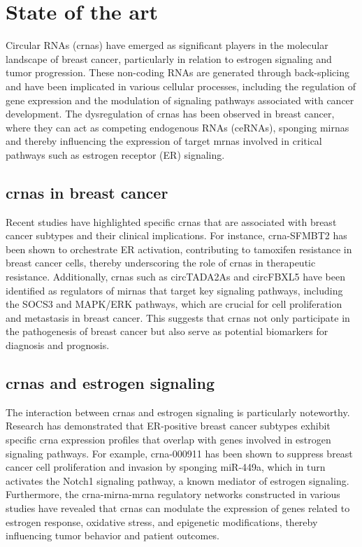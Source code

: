 \section{State of the art}
Circular RNAs (\gls{crna}s) have emerged as significant players in the
molecular landscape of breast cancer, particularly in relation to estrogen
signaling and tumor progression.
These non-coding RNAs are generated through back-splicing and have been
implicated in various cellular processes, including the regulation of gene
expression and the modulation of signaling pathways associated with cancer
development\supercite{li_circrna-sfmbt2_2023,tran_new_2020}.
The dysregulation of \gls{crna}s has been observed in breast cancer, where they
can act as competing endogenous RNAs (ceRNAs), sponging \gls{mirna}s and
thereby influencing the expression of target \gls{mrna}s involved in critical
pathways such as estrogen receptor (ER)
signaling\supercite{nair_circular_2016,xu_circrna_2022}.

\subsection{\Gls{crna}s in breast cancer}
Recent studies have highlighted specific \gls{crna}s that are associated with
breast cancer subtypes and their clinical implications.
For instance, \gls{crna}-SFMBT2 has been shown to orchestrate ER\textalpha{}
activation, contributing to tamoxifen resistance in breast cancer cells,
thereby underscoring the role of \gls{crna}s in therapeutic
resistance\supercite{li_circrna-sfmbt2_2023}.
Additionally, \gls{crna}s such as circTADA2As and circFBXL5 have been
identified as regulators of \gls{mirna}s that target key signaling pathways,
including the SOCS3 and MAPK/ERK pathways, which are crucial for cell
proliferation and metastasis in breast
cancer\supercite{xu_circtada2as_2019,gao_hsa_circrna_0006528_2019}.
This suggests that \gls{crna}s not only participate in the pathogenesis of
breast cancer but also serve as potential biomarkers for diagnosis and
prognosis\supercite{liu_influence_2021,chen_circepsti1_2018}.

\subsection{\Gls{crna}s and estrogen signaling}
The interaction between \gls{crna}s and estrogen signaling is particularly
noteworthy.
Research has demonstrated that ER-positive breast cancer subtypes exhibit
specific \gls{crna} expression profiles that overlap with genes involved in
estrogen signaling pathways\supercite{nair_circular_2016}.
For example, \gls{crna}-000911 has been shown to suppress breast cancer cell
proliferation and invasion by sponging miR-449a, which in turn activates the
Notch1 signaling pathway, a known mediator of estrogen
signaling\supercite{wang_comprehensive_2018}.
Furthermore, the \gls{crna}-\gls{mirna}-\gls{mrna} regulatory networks
constructed in various studies have revealed that \gls{crna}s can modulate the
expression of genes related to estrogen response, oxidative stress, and
epigenetic modifications, thereby influencing tumor behavior and patient
outcomes\supercite{xu_circrna_2022,nair_circular_2016}.
